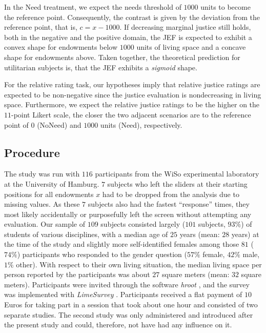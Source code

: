 \documentclass[12pt]{scrartcl}
\begin{document}
In the Need treatment, we expect the needs threshold of $1000$ units to become the reference point.
Consequently, the contrast is given by the deviation from the reference point, that is, $c=x-1000$.
If decreasing marginal justice still holds, both in the negative and the positive domain, the JEF is expected to exhibit a convex shape for endowments below $1000$ units of living space and a concave shape for endowments above. Taken together, the theoretical prediction for utilitarian subjects is, that the JEF exhibits a \textit{sigmoid} shape.

For the relative rating task, our hypotheses imply that relative justice ratings are expected to be non-negative since the justice evaluation is nondecreasing in living space.
Furthermore, we expect the relative justice ratings to be the higher on the $11$-point Likert scale, the closer the two adjacent scenarios are to the reference point of $0$ (NoNeed) and $1000$ units (Need), respectively.


\subsection{Procedure}\label{sec:procedure}
The study was run with $116$ participants from the WiSo experimental laboratory at the University of Hamburg.
$7$ subjects who left the sliders at their starting positions for all endowments $x$ had to be dropped from the analysis due to missing values.
As these $7$ subjects also had the fastest ``response'' times, they most likely accidentally or purposefully left the screen without attempting any evaluation.
Our sample of $109$ subjects consisted largely ($101$ subjects, $93\%$) of students of various disciplines, with a median age of $25$ years (mean: $28$ years) at the time of the study and slightly more self-identified females among those $81$ ($74\%$) participants who responded to the gender question ($57\%$ female, $42\%$ male, $1\%$ other).
With respect to their own living situation, the median living space per person reported by the participants was about $27$ square meters (mean: $32$ square meters).
Participants were invited through the software \textit{hroot} \citep{bock_hroot_2014}, and the survey was implemented with \textit{LimeSurvey} \citep{limesurvey_project_team_limesurvey_2020}.
Participants received a flat payment of $10$ Euros for taking part in a session that took about one hour and consisted of two separate  studies.
The second study was only administered and introduced after the present study and could, therefore, not have had any influence on it.
\end{document}
